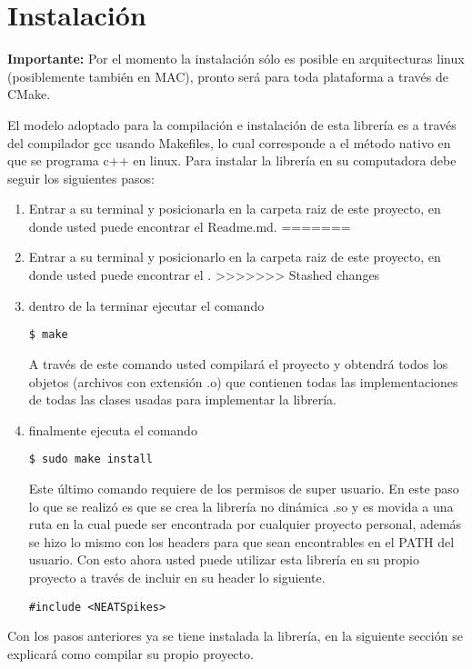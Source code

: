 \newpage
\section{Instalación}

\textbf{Importante:} Por el momento la instalación sólo es posible en arquitecturas linux (posiblemente también en MAC), pronto será para toda plataforma a través de CMake. \newline


El modelo adoptado para la compilación e instalación de esta librería es a través del compilador gcc usando Makefiles, lo cual corresponde a el método nativo en que se programa c++ en linux. Para instalar la librería en su computadora debe seguir los siguientes pasos: \newline

\begin{enumerate}
<<<<<<< Updated upstream
\item Entrar a su terminal y posicionarla en la carpeta raiz de este proyecto, en donde usted puede encontrar el Readme.md.
=======
\item Entrar a su terminal y posicionarlo en la carpeta raiz de este proyecto, en donde usted puede encontrar el .
>>>>>>> Stashed changes
\item dentro de la terminar ejecutar el comando 
\begin{lstlisting}
$ make
\end{lstlisting}
A través de este comando usted compilará el proyecto y obtendrá todos los objetos (archivos con extensión .o) que contienen todas las implementaciones de todas las clases usadas para implementar la librería.

\item finalmente ejecuta el comando
\begin{lstlisting}
$ sudo make install
\end{lstlisting}
Este último comando requiere de los permisos de super usuario. En este paso lo que se realizó es que se crea la librería no dinámica .so y es movida a una ruta en la cual puede ser encontrada por cualquier proyecto personal, además se hizo lo mismo con los headers para que sean encontrables en el PATH del usuario. Con esto ahora usted puede utilizar esta librería en su propio proyecto a través de incluir en su header lo siguiente.
\begin{lstlisting}
#include <NEATSpikes>
\end{lstlisting}


\end{enumerate}


Con los pasos anteriores ya se tiene instalada la librería, en la siguiente sección se explicará como compilar su propio proyecto.